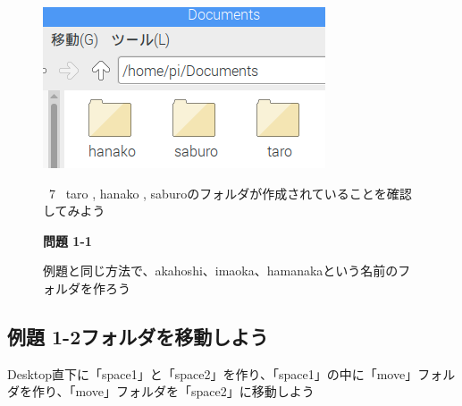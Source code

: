 \documentclass[a4paper,12pt]{jarticle}
\begin{document}
\begin{figure}
  \centering
  \includegraphics[width=8.359cm,height=4.761cm]{textbook-img043.png}
  \begin{minipage}{\textwidth}
    \ 7 \ taro , hanako ,
    saburoのフォルダが作成されていることを確認してみよう
  \end{minipage}
  \vspace{10mm}
  \flushleft
  {\bfseries
    問題 1-1}

  例題と同じ方法で、akahoshi、imaoka、hamanakaという名前のフォルダを作ろう

\end{figure}
\clearpage\subsection{例題 1-2フォルダを移動しよう}
Desktop直下に「space1」と「space2」を作り、「space1」の中に「move」フォルダを作り、「move」フォルダを「space2」に移動しよう

\end{document}
